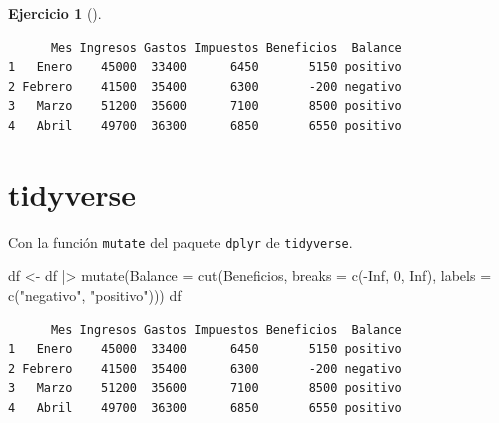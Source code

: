 \documentclass[
  a4paper,
]{scrreport}
\newenvironment{Shaded}{\begin{snugshade}}{\end{snugshade}}
\newcommand{\AttributeTok}[1]{\textcolor[rgb]{0.40,0.45,0.13}{#1}}
\newcommand{\ConstantTok}[1]{\textcolor[rgb]{0.56,0.35,0.01}{#1}}
\newcommand{\DecValTok}[1]{\textcolor[rgb]{0.68,0.00,0.00}{#1}}
\newcommand{\FunctionTok}[1]{\textcolor[rgb]{0.28,0.35,0.67}{#1}}
\newcommand{\NormalTok}[1]{\textcolor[rgb]{0.00,0.23,0.31}{#1}}
\newcommand{\OtherTok}[1]{\textcolor[rgb]{0.00,0.23,0.31}{#1}}
\newcommand{\SpecialCharTok}[1]{\textcolor[rgb]{0.37,0.37,0.37}{#1}}
\newcommand{\StringTok}[1]{\textcolor[rgb]{0.13,0.47,0.30}{#1}}
\theoremstyle{definition}
\newtheorem{exercise}{Ejercicio}[chapter]
\theoremstyle{remark}
\begin{document}
\begin{exercise}[]
\begin{enumerate}
\begin{tcolorbox}
\begin{Shaded}
\end{Shaded}

\begin{verbatim}
      Mes Ingresos Gastos Impuestos Beneficios  Balance
1   Enero    45000  33400      6450       5150 positivo
2 Febrero    41500  35400      6300       -200 negativo
3   Marzo    51200  35600      7100       8500 positivo
4   Abril    49700  36300      6850       6550 positivo
\end{verbatim}

  \section{tidyverse}

  Con la función \texttt{mutate} del paquete \texttt{dplyr} de
  \texttt{tidyverse}.

\begin{Shaded}
\begin{Highlighting}[]
\NormalTok{df }\OtherTok{\textless{}{-}}\NormalTok{ df }\SpecialCharTok{|\textgreater{}}
    \FunctionTok{mutate}\NormalTok{(}\AttributeTok{Balance =} \FunctionTok{cut}\NormalTok{(Beneficios, }\AttributeTok{breaks =} \FunctionTok{c}\NormalTok{(}\SpecialCharTok{{-}}\ConstantTok{Inf}\NormalTok{, }\DecValTok{0}\NormalTok{, }\ConstantTok{Inf}\NormalTok{), }\AttributeTok{labels =} \FunctionTok{c}\NormalTok{(}\StringTok{"negativo"}\NormalTok{, }\StringTok{"positivo"}\NormalTok{)))}
\NormalTok{df}
\end{Highlighting}
\end{Shaded}

\begin{verbatim}
      Mes Ingresos Gastos Impuestos Beneficios  Balance
1   Enero    45000  33400      6450       5150 positivo
2 Febrero    41500  35400      6300       -200 negativo
3   Marzo    51200  35600      7100       8500 positivo
4   Abril    49700  36300      6850       6550 positivo
\end{verbatim}


\end{tcolorbox}
\end{enumerate}
\end{exercise}
\end{document}
